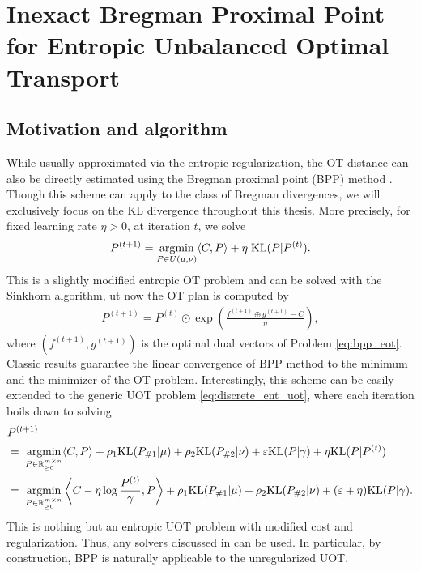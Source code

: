 
\section{Inexact Bregman Proximal Point for Entropic Unbalanced Optimal Transport}
\label{sec:input}

\subsection{Motivation and algorithm}

While usually approximated via the entropic regularization, the OT distance can also be directly
estimated using the Bregman proximal point (BPP) method \citep{Chen93,Teboulle97}.
Though this scheme can apply to the class of Bregman divergences,
we will exclusively focus on the KL divergence throughout this thesis.
More precisely, for fixed learning rate $\eta > 0$, at iteration $t$, we solve
\begin{align}
  \label{eq:bpp_eot}
  P^{(t+1)} = \operatorname*{argmin}_{P \in U(\mu, \nu)} \langle C, P \rangle + \eta \; \text{KL}(P | P^{(t)}).
\end{align}
This is a slightly modified entropic OT problem and can be solved with the Sinkhorn algorithm,
ut now the OT plan is computed by
\begin{align}
  P^{(t+1)} = P^{(t)} \odot \exp \left( \frac{f^{(t+1)} \oplus g^{(t+1)} - C}{\eta} \right),
\end{align}
where $(f^{(t+1)}, g^{(t+1)})$ is the optimal dual vectors of Problem \eqref{eq:bpp_eot}.
Classic results \citep{Chen93} guarantee the linear convergence of BPP method
to the minimum and the minimizer of the OT problem. Interestingly, this scheme can be easily extended to the
generic UOT problem \eqref{eq:discrete_ent_uot}, where each iteration boils down to solving
\begin{align}
\label{eq:bpp_uot}
  &P^{(t+1)} \\
  &= \; \operatorname*{argmin}_{P \in \mathbb R^{m \times n}_{\geq 0}}
  \langle C, P \rangle + \rho_1 \text{KL}(P_{\# 1} | \mu)
  + \rho_2 \text{KL}(P_{\# 2} | \nu) + \varepsilon \text{KL}(P | \gamma) + \eta \text{KL}(P | P^{(t)}) \\
  &= \; \operatorname*{argmin}_{P \in \mathbb R^{m \times n}_{\geq 0}}
  \left \langle C - \eta \log \frac{P^{(t)}}{\gamma}, P \right \rangle
  + \rho_1 \text{KL}(P_{\# 1} | \mu) + \rho_2 \text{KL}(P_{\# 2} | \nu) + (\varepsilon + \eta) \text{KL}(P | \gamma).
\end{align}
This is nothing but an entropic UOT problem with modified cost and regularization.
Thus, any solvers discussed in  can be used. In particular,
by construction, BPP is naturally applicable to the unregularized UOT.

